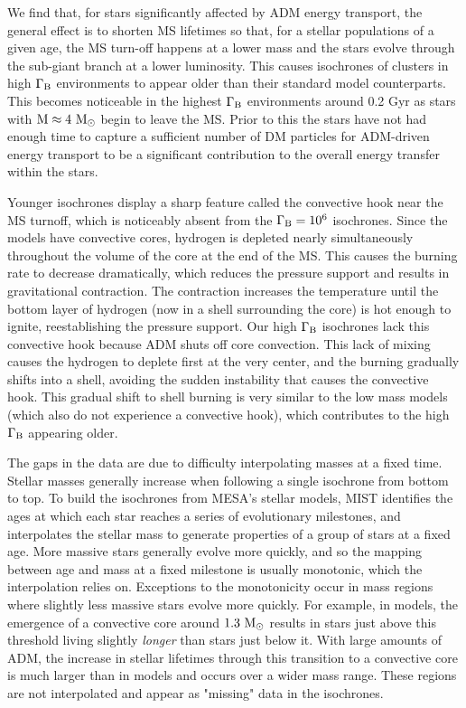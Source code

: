 \documentclass[useAMS,usenatbib]{mnras}
\begin{document}
We find that, for stars significantly affected by ADM energy transport, the general effect is to shorten MS lifetimes so that, for a stellar populations of a given age, the MS turn-off happens at a lower mass and the stars evolve through the sub-giant branch at a lower luminosity. This causes isochrones of clusters in high $\Gamma_\mathrm{B}$ environments to appear older than their standard model counterparts. This becomes noticeable in the highest $\Gamma_\mathrm{B}$ environments around 0.2 Gyr as stars with $\rm{M} \approx 4 \ \mathrm{M}_{\odot}$ begin to leave the MS. Prior to this the stars have not had enough time to capture a sufficient number of DM particles for ADM-driven energy transport to be a significant contribution to the overall energy transfer within the stars.

Younger \nodm isochrones display a sharp feature called the convective hook near the MS turnoff, which is noticeably absent from the $\Gamma_\mathrm{B} = 10^{6}$ isochrones. Since the \nodm models have convective cores, hydrogen is depleted nearly simultaneously throughout the volume of the core at the end of the MS. This causes the burning rate to decrease dramatically, which reduces the pressure support and results in gravitational contraction. The contraction increases the temperature until the bottom layer of hydrogen (now in a shell surrounding the core) is hot enough to ignite, reestablishing the pressure support. Our high $\Gamma_\mathrm{B}$ isochrones lack this convective hook because ADM shuts off core convection. This lack of mixing causes the hydrogen to deplete first at the very center, and the burning gradually shifts into a shell, avoiding the sudden instability that causes the convective hook. This gradual shift to shell burning is very similar to the low mass \nodm models (which also do not experience a convective hook), which contributes to the high $\Gamma_\mathrm{B}$ appearing older.

The gaps in the data are due to difficulty interpolating masses at a fixed time. Stellar masses generally increase when following a single isochrone from bottom to top. To build the isochrones from MESA's stellar models, MIST identifies the ages at which each star reaches a series of evolutionary milestones, and interpolates the stellar mass to generate properties of a group of stars at a fixed age. More massive stars generally evolve more quickly, and so the mapping between age and mass at a fixed milestone is usually monotonic, which the interpolation relies on. Exceptions to the monotonicity occur in mass regions where slightly less massive stars evolve more quickly. For example, in \nodm models, the emergence of a convective core around $1.3 \ \mathrm{M}_{\odot}$ results in stars just above this threshold living slightly \textit{longer} than stars just below it. With large amounts of ADM, the increase in stellar lifetimes through this transition to a convective core is much larger than in \nodm models and occurs over a wider mass range. These regions are not interpolated and appear as "missing" data in the isochrones.
\end{document}
